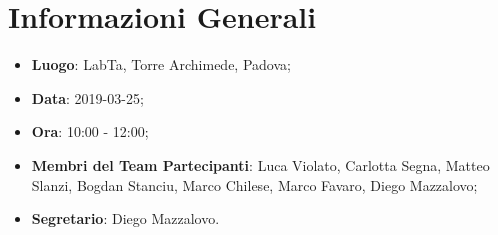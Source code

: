 \section{Informazioni Generali}
\begin{itemize}
	\item \textbf{Luogo}: LabTa, Torre Archimede, Padova; 
	\item \textbf{Data}: 2019-03-25;
	\item \textbf{Ora}: 10:00 - 12:00;
	\item \textbf{Membri del Team Partecipanti}: Luca Violato, Carlotta Segna, Matteo Slanzi, Bogdan Stanciu, Marco Chilese, Marco Favaro, Diego Mazzalovo; 
	\item \textbf{Segretario}: Diego Mazzalovo. 
\end{itemize}


